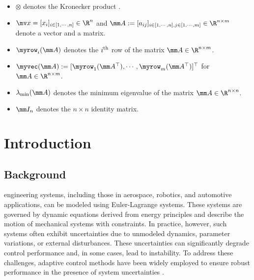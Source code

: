 \documentclass[lettersize,journal]{IEEEtran}
\begin{document}
\begin{itemize}
    \item $\otimes$ denotes the Kronecker product \cite[Definition 7.1.2]{Bernstein:2009aa}.
    \item $\mv x=[x_i]_{i\in[1,\cdots,n]}\in\R^n$ and $
        \mm A
        := 
        [a_{ij}]
        _{
            i\in[1,\cdots,n],j\in[1,\cdots ,m]
        }\allowbreak\in\R^{n\times m}
        $ denote a vector and a matrix.
    \item $\myrow_i(\mm A)$ denotes the $i\textsuperscript{th}$ row of the matrix $\mm A\in\R^{n\times m}$. 
    \item $\myvec(\mm A):= [\myrow_1(\mm A^\top)  ,\cdots,\myrow_m(\mm A^\top)  ]^\top   $ for $\mm A\in\R^{n\times m}$.
    \item $\lambda_{\min}(\mm A)$ denotes the minimum eigenvalue of the matrix $\mm A\in\R^{n\times n}$.
    \item $\mm I_n$ denotes the $n\times n$ identity matrix.
\end{itemize}

\section{Introduction}

\subsection{Background}

 engineering systems, including those in aerospace, robotics, and automotive applications, can be modeled using Euler-Lagrange systems. 
These systems are governed by dynamic equations derived from energy principles and describe the motion of mechanical systems with constraints. 
In practice, however, such systems often exhibit uncertainties due to unmodeled dynamics, parameter variations, or external disturbances. 
These uncertainties can significantly degrade control performance and, in some cases, lead to instability. 
To address these challenges, adaptive control methods have been widely employed to ensure robust performance in the presence of system uncertainties \cite{Ioannou:2006aa, Tao:2003aa}.
\end{document}
